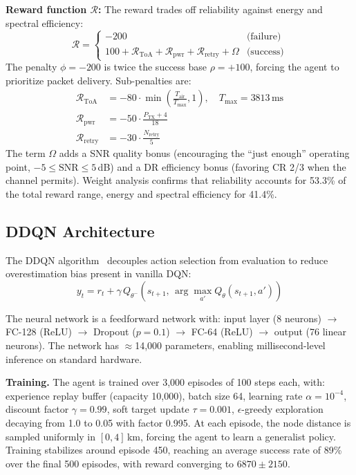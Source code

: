 \documentclass[conference]{IEEEtran}
\begin{document}
	\textbf{Reward function $\mathcal{R}$:}
	The reward trades off reliability against energy and spectral efficiency:
	\begin{equation}
		\mathcal{R} =
		\begin{cases}
			-200 & \text{(failure)} \\[4pt]
			100 + \mathcal{R}_{\text{ToA}} + \mathcal{R}_{\text{pwr}}
			+ \mathcal{R}_{\text{retry}} + \Omega & \text{(success)}
		\end{cases}
	\end{equation}
	The penalty $\phi = -200$ is twice the success base $\rho = +100$, forcing the
	agent to prioritize packet delivery. Sub-penalties are:
	\begin{align}
		\mathcal{R}_{\text{ToA}} &= -80 \cdot \min\!\left(\tfrac{T_{\text{air}}}{T_{\max}}, 1\right),
		\quad T_{\max} = 3813\,\text{ms} \\
		\mathcal{R}_{\text{pwr}} &= -50 \cdot \tfrac{P_{\text{TX}}+4}{18} \\
		\mathcal{R}_{\text{retry}} &= -30 \cdot \tfrac{N_{\text{retry}}}{5}
	\end{align}
	The term $\Omega$ adds a SNR quality bonus (encouraging the ``just enough''
	operating point, $-5 \leq \text{SNR} \leq 5$\,dB) and a DR efficiency bonus
	(favoring CR 2/3 when the channel permits). Weight analysis confirms that
	reliability accounts for 53.3\% of the total reward range, energy and spectral
	efficiency for 41.4\%.
	
	\subsection{DDQN Architecture}
	
	The DDQN algorithm~\cite{mnih2015dqn,vanhasselt2016ddqn} decouples action
	selection from evaluation to reduce overestimation bias present in vanilla DQN:
	\begin{equation}
		y_t = r_t + \gamma\,Q_{\theta^-}\!\!\left(s_{t+1},\,
		\arg\max_{a'} Q_\theta(s_{t+1}, a')\right)
	\end{equation}
	
	The neural network is a feedforward network with: input layer (8 neurons) $\to$
	FC-128 (ReLU) $\to$ Dropout ($p = 0.1$) $\to$ FC-64 (ReLU) $\to$ output (76
	linear neurons). The network has $\approx$14,000 parameters, enabling
	millisecond-level inference on standard hardware.
	
	\textbf{Training.}
	The agent is trained over 3,000 episodes of 100 steps each, with:
	experience replay buffer (capacity 10,000),
	batch size 64,
	learning rate $\alpha = 10^{-4}$,
	discount factor $\gamma = 0.99$,
	soft target update $\tau = 0.001$,
	$\epsilon$-greedy exploration decaying from 1.0 to 0.05 with factor 0.995.
	At each episode, the node distance is sampled uniformly in $[0, 4]$\,km,
	forcing the agent to learn a generalist policy. Training stabilizes around
	episode 450, reaching an average success rate of 89\% over the final 500
	episodes, with reward converging to $6870 \pm 2150$.
	
\end{document}
